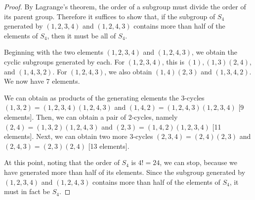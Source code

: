 \documentclass{article}
\begin{document}
\begin{proof}
    By Lagrange's theorem, the order of a subgroup must divide the order of its parent group. Therefore it suffices to show that, if the subgroup of $S_4$ generated by $(1, 2, 3, 4)$ and $(1, 2, 4, 3)$ contains more than half of the elements of $S_4$, then it must be all of $S_4$.

    Beginning with the two elements $(1, 2, 3, 4)$ and $(1, 2, 4, 3)$, we obtain the cyclic subgroups generated by each. For $(1, 2, 3, 4)$, this is $(1), (1, 3)(2, 4)$, and $(1, 4, 3, 2)$. For $(1, 2, 4, 3)$, we also obtain $(1, 4)(2, 3)$ and $(1, 3, 4, 2)$. We now have 7 elements.

    We can obtain as products of the generating elements the 3-cycles $(1, 3, 2) = (1, 2, 3, 4)(1, 2, 4, 3)$ and $(1, 4, 2) = (1, 2, 4, 3)(1, 2, 3, 4)$ [9 elements]. Then, we can obtain a pair of 2-cycles, namely $(2, 4) = (1, 3, 2)(1, 2, 4, 3)$ and $(2, 3) = (1, 4, 2)(1, 2, 3, 4)$ [11 elements]. Next, we can obtain two more 3-cycles $(2, 3, 4) = (2, 4)(2, 3)$ and $(2, 4, 3) = (2, 3)(2, 4)$ [13 elements].

    At this point, noting that the order of $S_4$ is $4! = 24$, we can stop, because we have generated more than half of its elements. Since the subgroup generated by $(1, 2, 3, 4)$ and $(1, 2, 4, 3)$ contains more than half of the elements of $S_4$, it must in fact be $S_4$.
\end{proof}
\end{document}

